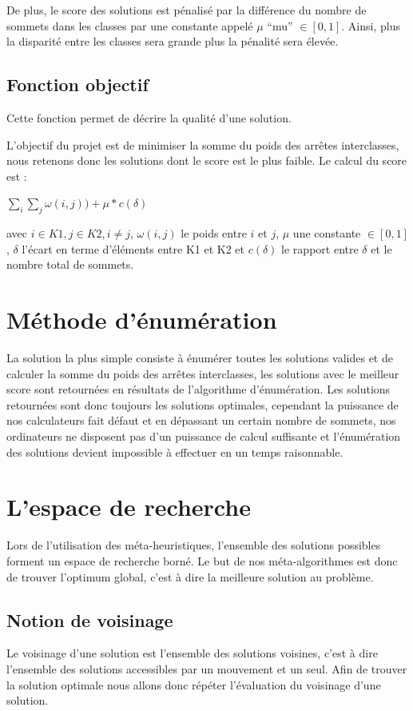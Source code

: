 \documentclass[a4paper]{article}
\begin{document}
	De plus, le score des solutions est pénalisé par la différence du nombre de sommets dans les classes par une constante appelé $\mu$ ``mu'' $\in [0,1]$. Ainsi, plus la disparité entre les classes sera grande plus la pénalité sera élevée.

	\subsection{Fonction objectif}
	Cette fonction permet de décrire la qualité d'une solution.


	L'objectif du projet est de minimiser la somme du poids des arrêtes interclasses, nous retenons donc les solutions dont le score est le plus faible. Le calcul du score est : 
	\begin{center}
	$\sum\limits_{i} \sum\limits_{j}  \omega (i,j)) + \mu * c(\delta)$
	\end{center}
	avec $i \in K1, j \in K2, i \ne j$, $\omega (i,j)$ le poids entre $i$ et $j$, $\mu$ une constante $\in [0,1]$, $\delta$ l'écart en terme d'éléments entre K1 et K2 et $c(\delta)$ le rapport entre $\delta$ et le nombre total de sommets.

\section{Méthode d’énumération}
La solution la plus simple consiste à énumérer toutes les solutions valides et de calculer la somme du poids des arrêtes interclasses, les solutions avec le meilleur score sont retournées en résultats de l'algorithme d'énumération. Les solutions retournées sont donc toujours les solutions optimales, cependant la puissance de nos calculateurs fait défaut et en dépassant un certain nombre de sommets, nos ordinateurs ne disposent pas d'un puissance de calcul suffisante et l'énumération des solutions devient impossible à effectuer en un temps raisonnable.

\section{L'espace de recherche}
Lors de l'utilisation des méta-heuristiques, l'ensemble des solutions possibles forment un espace de recherche borné. Le but de nos méta-algorithmes est donc de trouver l'optimum global, c'est à dire la meilleure solution au problème.
	\subsection{Notion de voisinage}
	Le voisinage d'une solution est l’ensemble des solutions voisines, c’est à dire l’ensemble des solutions accessibles par un mouvement et un seul. Afin de trouver la solution optimale nous allons donc répéter l'évaluation du voisinage d'une solution.
\end{document}
